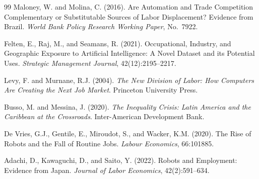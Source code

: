 \documentclass{article}
\begin{document}
\begin{thebibliography}{99}
Maloney, W. and Molina, C. (2016). Are Automation and Trade Competition Complementary or Substitutable Sources of Labor Displacement? Evidence from Brazil. \textit{World Bank Policy Research Working Paper}, No.~7922.

Felten, E., Raj, M., and Seamans, R. (2021). Occupational, Industry, and Geographic Exposure to Artificial Intelligence: A Novel Dataset and its Potential Uses. \textit{Strategic Management Journal}, 42(12):2195--2217.

Levy, F. and Murnane, R.J. (2004). \textit{The New Division of Labor: How Computers Are Creating the Next Job Market}. Princeton University Press.

Busso, M. and Messina, J. (2020). \textit{The Inequality Crisis: Latin America and the Caribbean at the Crossroads}. Inter-American Development Bank.

De Vries, G.J., Gentile, E., Miroudot, S., and Wacker, K.M. (2020). The Rise of Robots and the Fall of Routine Jobs. \textit{Labour Economics}, 66:101885.

Adachi, D., Kawaguchi, D., and Saito, Y. (2022). Robots and Employment: Evidence from Japan. \textit{Journal of Labor Economics}, 42(2):591--634.

\end{thebibliography}
\end{document}
